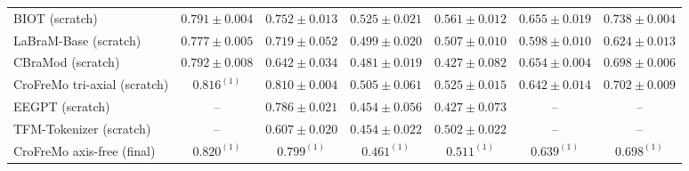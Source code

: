 \begin{table}[h]
\begin{tabular}{lcccccc}
BIOT (scratch) & $0.791 \pm 0.004$ & $0.752 \pm 0.013$ & $0.525 \pm 0.021$ & $0.561 \pm 0.012$ & $0.655 \pm 0.019$ & $0.738 \pm 0.004$ \\
LaBraM-Base (scratch) & $0.777 \pm 0.005$ & $0.719 \pm 0.052$ & $0.499 \pm 0.020$ & $0.507 \pm 0.010$ & $0.598 \pm 0.010$ & $0.624 \pm 0.013$ \\
CBraMod (scratch) & $0.792 \pm 0.008$ & $0.642 \pm 0.034$ & $0.481 \pm 0.019$ & $0.427 \pm 0.082$ & $0.654 \pm 0.004$ & $0.698 \pm 0.006$ \\
CroFreMo tri-axial (scratch) & $0.816^{(1)}$ & $0.810 \pm 0.004$ & $0.505 \pm 0.061$ & $0.525 \pm 0.015$ & $0.642 \pm 0.014$ & $0.702 \pm 0.009$ \\
EEGPT (scratch) & -- & $0.786 \pm 0.021$ & $0.454 \pm 0.056$ & $0.427 \pm 0.073$ & -- & -- \\
TFM-Tokenizer (scratch) & -- & $0.607 \pm 0.020$ & $0.454 \pm 0.022$ & $0.502 \pm 0.022$ & -- & -- \\
CroFreMo axis-free (final) & $0.820^{(1)}$ & $0.799^{(1)}$ & $0.461^{(1)}$ & $0.511^{(1)}$ & $0.639^{(1)}$ & $0.698^{(1)}$ \\
\bottomrule
\end{tabular}
\end{table}
